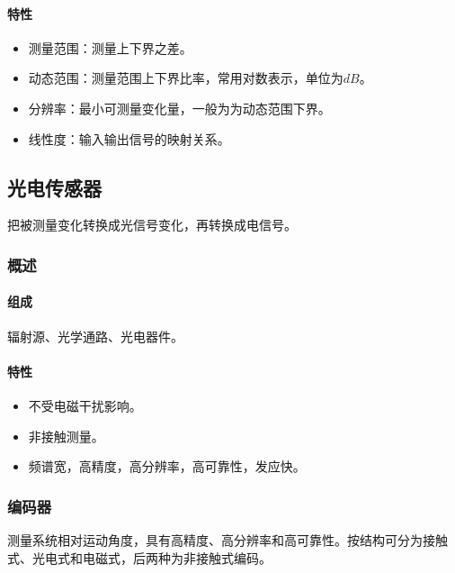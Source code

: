 \documentclass[
12pt, %
a4paper, 
oneside, %
headinclude,footinclude, %
]{scrartcl}
\begin{document}
\paragraph{特性}
\begin{itemize}
\item 测量范围：测量上下界之差。    
\item 动态范围：测量范围上下界比率，常用对数表示，单位为$ dB $。
\item 分辨率：最小可测量变化量，一般为为动态范围下界。
\item 线性度：输入输出信号的映射关系。
\end{itemize}
\subsection[光电传感器]{光电传感器}
把被测量变化转换成光信号变化，再转换成电信号。
\subsubsection[概述]{概述}
\paragraph{组成}
辐射源、光学通路、光电器件。
\paragraph{特性}
\begin{itemize}
\item 不受电磁干扰影响。
\item 非接触测量。
\item 频谱宽，高精度，高分辨率，高可靠性，发应快。
\end{itemize}
\subsubsection[编码器]{编码器}
测量系统相对运动角度，具有高精度、高分辨率和高可靠性。按结构可分为接触式、光电式和电磁式，后两种为非接触式编码。
\end{document}
